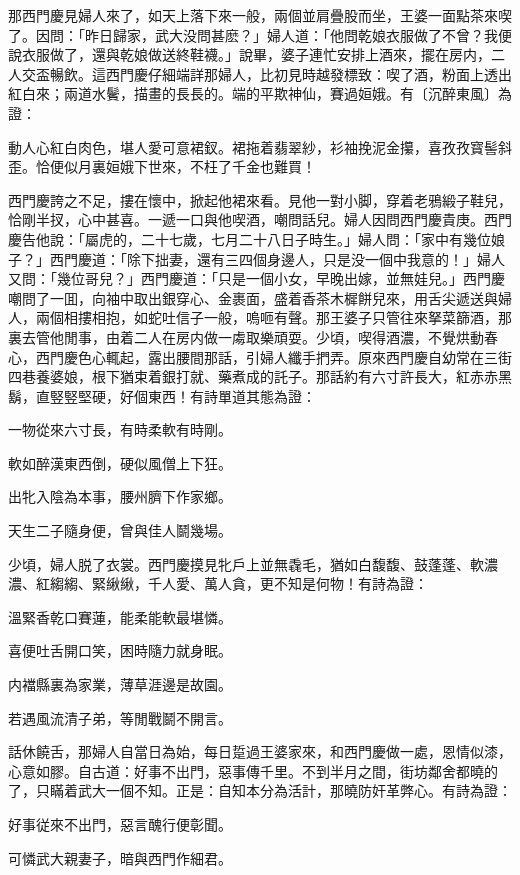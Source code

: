 那西門慶見婦人來了，如天上落下來一般，兩個並肩疊股而坐，王婆一面點茶來喫了。因問：「昨日歸家，武大没問甚麽？」婦人道：「他問乾娘衣服做了不曾？我便說衣服做了，還與乾娘做送終鞋襪。」說畢，婆子連忙安排上酒來，擺在房内，二人交盃暢飲。這西門慶仔細端詳那婦人，比初見時越發標致：喫了酒，粉面上透出紅白來；兩道水鬢，描畫的長長的。端的平欺神仙，賽過姮娥。有〔沉醉東風〕為證：

\begin{myquote}
動人心紅白肉色，堪人愛可意裙釵。裙拖着翡翠紗，衫袖挽泥金攥，喜孜孜寳髻斜歪。恰便似月裏姮娥下世來，不枉了千金也難買！
\end{myquote}

西門慶誇之不足，摟在懷中，掀起他裙來看。見他一對小脚，穿着老鴉緞子鞋兒，恰剛半扠，心中甚喜。一遞一口與他喫酒，嘲問話兒。婦人因問西門慶貴庚。西門慶告他說：「屬虎的，二十七歲，七月二十八日子時生。」婦人問：「家中有幾位娘子？」西門慶道：「除下拙妻，還有三四個身邊人，只是没一個中我意的！」婦人又問：「幾位哥兒？」西門慶道：「只是一個小女，早晚出嫁，並無娃兒。」西門慶嘲問了一囬，向袖中取出銀穿心、金裹面，盛着香茶木樨餅兒來，用舌尖遞送與婦人，兩個相摟相抱，如蛇吐信子一般，嗚咂有聲。那王婆子只管往來拏菜篩酒，那裏去管他閒事，由着二人在房内做一䖏取樂頑耍。少頃，喫得酒濃，不覺烘動春心，西門慶色心輒起，露出腰間那話，引婦人纖手捫弄。原來西門慶自幼常在三街四巷養婆娘，根下猶束着銀打就、藥煮成的託子。那話約有六寸許長大，紅赤赤黑鬍，直竪竪堅硬，好個東西！有詩單道其態為證：

\begin{myquote}
一物從來六寸長，有時柔軟有時剛。

軟如醉漢東西倒，硬似風僧上下狂。

出牝入陰為本事，腰州臍下作家鄉。

天生二子隨身便，曾與佳人鬬幾場。
\end{myquote}

少頃，婦人脱了衣裳。西門慶摸見牝戶上並無毳毛，猶如白馥馥、鼓蓬蓬、軟濃濃、紅縐縐、緊䋺䋺，千人愛、萬人貪，更不知是何物！有詩為證：
\begin{myquote}
溫緊香乾口賽蓮，能柔能軟最堪憐。

喜便吐舌開口笑，困時隨力就身眠。

内襠縣裏為家業，薄草涯邊是故園。

若遇風流清子弟，等閒戰鬬不開言。
\end{myquote}

話休饒舌，那婦人自當日為始，每日踅過王婆家來，和西門慶做一處，恩情似漆，心意如膠。自古道：好事不出門，惡事傳千里。不到半月之間，街坊鄰舍都曉的了，只瞞着武大一個不知。正是：自知本分為活計，那曉防奸革弊心。有詩為證：
\begin{myquote}
好事従來不出門，惡言醜行便彰聞。

可憐武大親妻子，暗與西門作細君。
\end{myquote}

